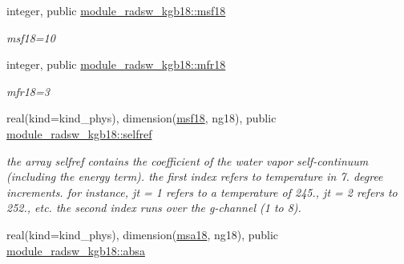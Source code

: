 \begin{DoxyCompactItemize}
\mbox{\label{group__module__radsw__kgbnn_ga1d74002f71710887e45df89d3897a10a}} 
integer, public \hyperlink{group__module__radsw__kgbnn_ga1d74002f71710887e45df89d3897a10a}{module\+\_\+radsw\+\_\+kgb18\+::msf18}
\begin{DoxyCompactList}\small\item\em msf18=10 \end{DoxyCompactList}\item 
\mbox{\label{group__module__radsw__kgbnn_ga9fa8140413e7ec769baea4f207e58393}} 
integer, public \hyperlink{group__module__radsw__kgbnn_ga9fa8140413e7ec769baea4f207e58393}{module\+\_\+radsw\+\_\+kgb18\+::mfr18}
\begin{DoxyCompactList}\small\item\em mfr18=3 \end{DoxyCompactList}\item 
\mbox{\label{group__module__radsw__kgbnn_ga488f807878d909b8f69457b0d7d8ac6a}} 
real(kind=kind\+\_\+phys), dimension(\hyperlink{group__module__radsw__kgbnn_ga1d74002f71710887e45df89d3897a10a}{msf18}, ng18), public \hyperlink{group__module__radsw__kgbnn_ga488f807878d909b8f69457b0d7d8ac6a}{module\+\_\+radsw\+\_\+kgb18\+::selfref}
\begin{DoxyCompactList}\small\item\em the array selfref contains the coefficient of the water vapor self-\/continuum (including the energy term). the first index refers to temperature in 7. degree increments. for instance, jt = 1 refers to a temperature of 245., jt = 2 refers to 252., etc. the second index runs over the g-\/channel (1 to 8). \end{DoxyCompactList}\item 
\mbox{\label{group__module__radsw__kgbnn_ga8a7787776bd057b1815e92a5f58b9cac}} 
real(kind=kind\+\_\+phys), dimension(\hyperlink{namespacemodule__radsw__kgb18_a48213008c9ed8f94aaad4ef327d38583}{msa18}, ng18), public \hyperlink{group__module__radsw__kgbnn_ga8a7787776bd057b1815e92a5f58b9cac}{module\+\_\+radsw\+\_\+kgb18\+::absa}

\end{DoxyCompactItemize}
